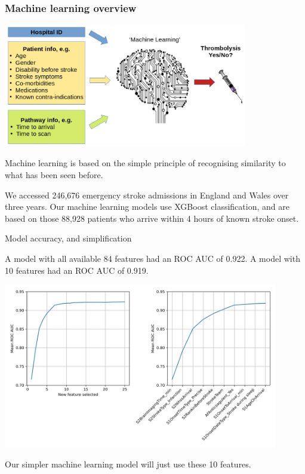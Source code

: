 \documentclass{beamer}
\begin{document}

\begin{frame}
\frametitle{Machine learning overview}
\begin{center}
\includegraphics[width=0.80\textwidth]{./images/ml_model_high_level}
\end{center}

\small
Machine learning is based on the simple principle of recognising similarity to what has been seen before.
\vspace{3mm}

We accessed 246,676 emergency stroke admissions in England and Wales over three years. Our machine learning models use XGBoost classification, and are based on those 88,928 patients who arrive within 4 hours of known stroke onset. 
\end{frame}


\begin{frame}{Model accuracy, and simplification}

A model with all available 84 features had an ROC AUC of 0.922. A model with 10 features had an ROC AUC of 0.919.

\begin{center}
\includegraphics[width=0.9\textwidth]{./images/01_feature_selection.jpg}
\end{center}

Our simpler machine learning model will just use these 10 features.

\end{frame}
\end{document}
